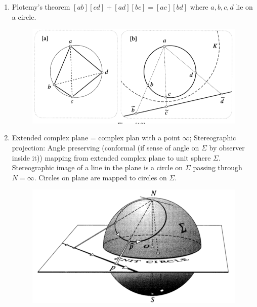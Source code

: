 \documentclass[12pt]{article}
\begin{document}
\begin{enumerate}
    \item Plotemy's theorem $[ab][cd] + [ad][bc] = [ac][bd]$ where $a,b,c,d$ lie on a circle.

    \begin{figure}[h!]
        \centering
        \includegraphics[scale=0.7]{fig_12}
        \label{f12}
    \end{figure}

    \item Extended complex plane = complex plan with a point $\infty$; Stereographic projection: Angle preserving (conformal (if sense of angle on $\Sigma$ by observer inside it)) mapping from extended complex plane to unit sphere $\Sigma$. Stereographic image of a line in the plane is a circle on $\Sigma$ passing through $N = \infty$. Circles on plane are mapped to circles on $\Sigma$.
    
    \begin{figure}[h!]
        \centering
        \includegraphics[scale=0.7]{fig_13}
        \label{f13}
    \end{figure}


\end{enumerate}
\end{document}
